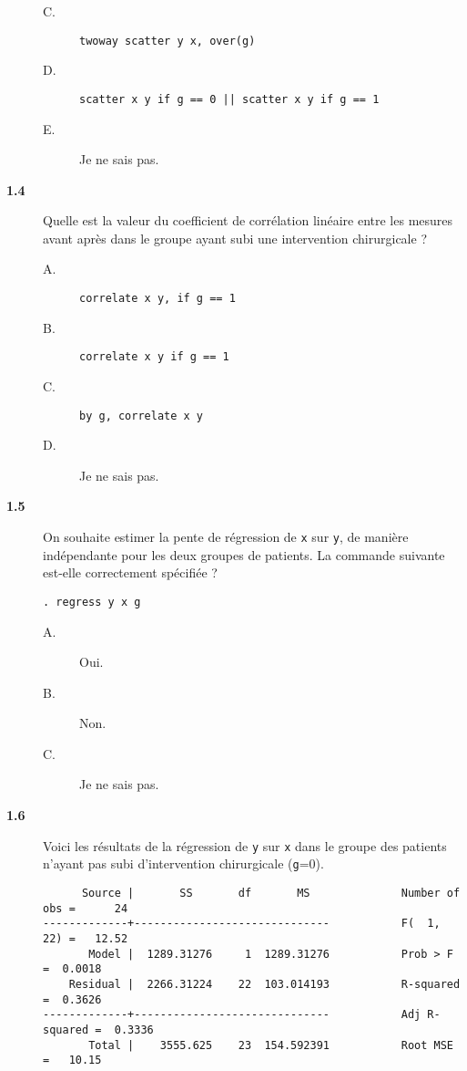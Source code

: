 \begin{description}
\begin{description}
\item[C.] \verb|twoway scatter y x, over(g)|
\item[D.] \verb+scatter x y if g == 0 || scatter x y if g == 1+
\item[E.] Je ne sais pas.
\end{description}
\item[\bf 1.4] Quelle est la valeur du coefficient de corrélation linéaire
  entre les mesures avant après dans le groupe ayant subi une intervention
  chirurgicale ? 
\begin{description}
\item[A.] \verb|correlate x y, if g == 1|
\item[B.] \verb|correlate x y if g == 1|
\item[C.] \verb|by g, correlate x y|
\item[D.] Je ne sais pas.
\end{description}
\item[\bf 1.5] On souhaite estimer la pente de régression de \texttt{x} sur
  \texttt{y}, de manière indépendante pour les deux groupes de patients. La
  commande suivante est-elle correctement spécifiée ? 
\begin{verbatim}
. regress y x g
\end{verbatim}
\begin{description}
\item[A.] Oui.
\item[B.] Non.
\item[C.] Je ne sais pas.
\end{description}
\item[\bf 1.6]  Voici les résultats de la régression de \texttt{y} sur
  \texttt{x} dans le groupe des patients n'ayant pas subi d'intervention
  chirurgicale (\texttt{g}=0). 
\begin{verbatim}
      Source |       SS       df       MS              Number of obs =      24
-------------+------------------------------           F(  1,    22) =   12.52
       Model |  1289.31276     1  1289.31276           Prob > F      =  0.0018
    Residual |  2266.31224    22  103.014193           R-squared     =  0.3626
-------------+------------------------------           Adj R-squared =  0.3336
       Total |    3555.625    23  154.592391           Root MSE      =   10.15


\end{verbatim}
\end{description}
